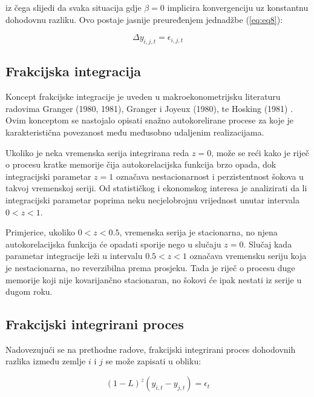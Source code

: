 \documentclass{crebsshr}
\begin{document}
    iz čega slijedi da svaka situacija gdje \( \beta = 0 \) implicira konvergenciju uz konstantnu dohodovnu razliku. Ovo postaje jasnije preuređenjem jednadžbe (\ref{eq:eq8}):
    
    \begin{equation} \label{eq:eq9}
    \Delta y_{i,j,t} = \epsilon_{i,j,t}
    \end{equation}
    
    \subsection{Frakcijska integracija}
    
    Koncept frakcijske integracije je uveden u makroekonometrijsku literaturu radovima Granger (1980, 1981), Granger i Joyeux (1980), te Hosking (1981) \citep{Granger1980, Granger1981, GrangerJoyeux1980, Hosking1981}. Ovim konceptom se nastojalo opisati snažno autokorelirane procese za koje je karakteristična povezanost među međusobno udaljenim realizacijama.
    
    Ukoliko je neka vremenska serija integrirana reda \( z=0 \), može se reći kako je riječ o procesu kratke memorije čija autokorelacijska funkcija brzo opada, dok integracijski parametar \( z=1 \) označava nestacionarnost i perzistentnost šokova u takvoj vremenskoj seriji. Od statističkog i ekonomskog interesa je analizirati da li integracijski parametar poprima neku necjelobrojnu vrijednost unutar intervala \( 0<z<1 \).
    
    Primjerice, ukoliko \( 0<z<0.5 \), vremenska serija je stacionarna, no njena autokorelacijska funkcija će opadati sporije nego u slučaju \( z=0 \). Slučaj kada parametar integracije leži u intervalu \( 0.5<z<1 \) označava vremensku seriju koja je nestacionarna, no reverzibilna prema prosjeku. Tada je riječ o procesu duge memorije koji nije kovarijančno stacionaran, no šokovi će ipak nestati iz serije u dugom roku.
    
    \subsection{Frakcijski integrirani proces}
    
    Nadovezujući se na prethodne radove, frakcijski integrirani proces dohodovnih razlika između zemlje \( i \) i \( j \) se može zapisati u obliku:
    
    \begin{equation} \label{eq:eq10}
    (1-L)^z (y_{i,t} - y_{j,t}) = \epsilon_t
    \end{equation}
    
\end{document}
